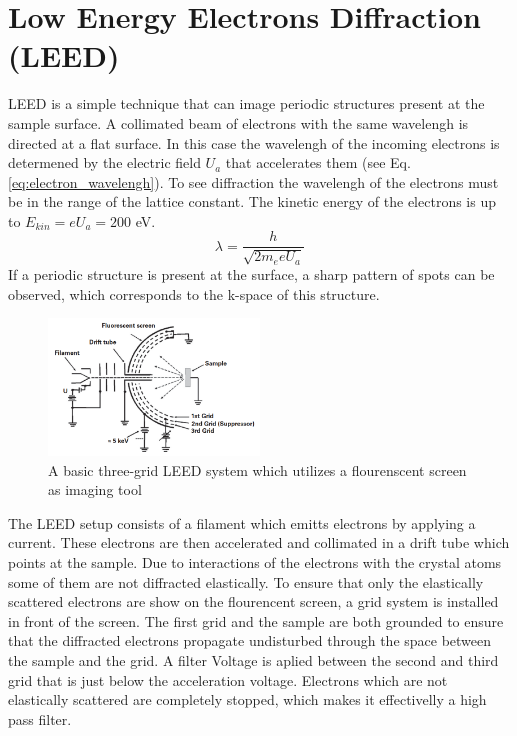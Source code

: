 \section{Low Energy Electrons Diffraction (LEED)}
\noindent LEED is a simple technique that can image periodic structures present at the sample surface.
A collimated beam of electrons with the same wavelengh is directed at a flat surface.
In this case the wavelengh of the incoming electrons is determened by the electric field $U_a$ that accelerates them (see Eq.\ref{eq:electron_wavelengh}).
To see diffraction the wavelengh of the electrons must be in the range of the lattice constant.
The kinetic energy of the electrons is up to $E_{kin} = e U_a = 200$ eV.
\begin{equation}
    \lambda = \frac{h}{\sqrt{2 m_e e U_a}}
    \label{eq:electron_wavelengh}
\end{equation} 
If a periodic structure is present at the surface, a sharp pattern of spots can be observed, which corresponds to the k-space of this structure.
\begin{figure}
    \centering
    \includegraphics[width=0.5\textwidth]{graphics/fundamental_leed_setup.PNG}
    \caption{A basic three-grid LEED system which utilizes a flourenscent screen as imaging tool \cite{MoritzWolfgang2022SSDb}}
    \label{fig:LEED_Shematics}
\end{figure}
\noindent The LEED setup consists of a filament which emitts electrons by applying a current.
These electrons are then accelerated and collimated in a drift tube which points at the sample.
Due to interactions of the electrons with the crystal atoms some of them are not diffracted elastically.
To ensure that only the elastically scattered electrons are show on the flourencent screen, a grid system is installed in front of the screen.
The first grid and the sample are both grounded to ensure that the diffracted electrons propagate undisturbed through the space between the sample and the grid.
A filter Voltage is aplied between the second and third grid that is just below the acceleration voltage.
Electrons which are not elastically scattered are completely stopped, which makes it effectivelly a high pass filter. \cite{MoritzWolfgang2022SSDb} \\
